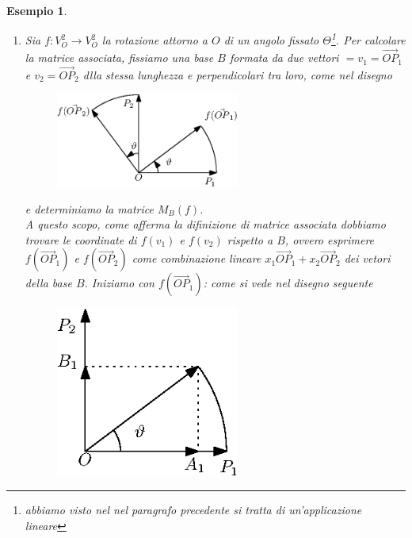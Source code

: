 \message{ !name(algebraegeometria.tex)}\documentclass{book}
\newtheorem{esempio}{Esempio}
\begin{document}
\begin{esempio}
  \begin{enumerate}
  \item Sia $f:V_O^2\to V_O^2$ la rotazione attorno a $O$ di un angolo fissato $\Theta$\footnote{abbiamo visto nel
      nel paragrafo precedente si tratta di un'applicazione lineare}. Per calcolare la matrice associata, fissiamo
    una base $B$ formata da due vettori $=v_1=\vec{OP}_1$ e $v_2=\vec{OP}_2$ dlla stessa lunghezza e
    perpendicolari tra loro, come nel disegno
    \begin{figure}[th]
      \centering
        \includegraphics[width=6cm]{img/finiti/imgex4-3-1.eps}
    \end{figure}

    e determiniamo la matrice $M_B(f)$.\\
    A questo scopo, come afferma la difinizione di matrice associata dobbiamo trovare le coordinate di $f(v_1)$ e
    $f(v_2)$ rispetto a $B$, ovvero esprimere $f(\vec{OP}_1)$ e $f(\vec{OP}_2)$ come combinazione lineare
    $x_1\vec{OP}_1+x_2\vec{OP}_2$ dei vetori della base $B$. Iniziamo con $f(\vec{OP}_1)$: come si vede nel
    disegno seguente
    \clearpage
    \begin{figure}[th]
      \centering
        \includegraphics[width=6cm]{img/finiti/imgex4-3-2.eps}
    \end{figure}


\end{enumerate}
\end{esempio}
\end{document}
